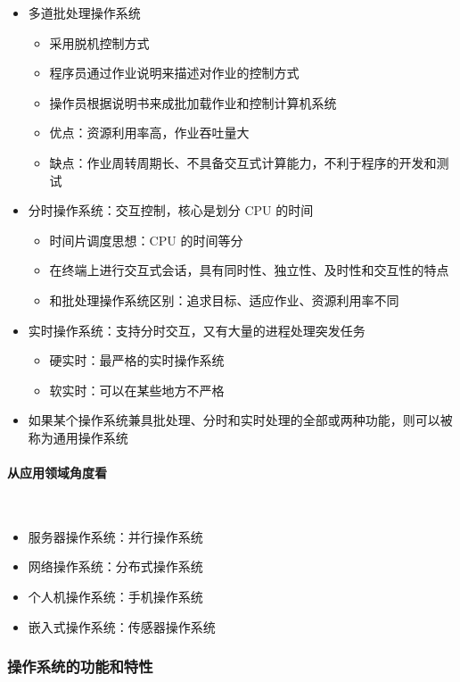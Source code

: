 \documentclass[cs4size,a4paper,10pt]{ctexart}
\begin{document}
		\begin{itemize}
			\item 多道批处理操作系统
			\begin{itemize}
				\item 采用脱机控制方式
				\item 程序员通过作业说明来描述对作业的控制方式
				\item 操作员根据说明书来成批加载作业和控制计算机系统
				\item 优点：资源利用率高，作业吞吐量大
				\item 缺点：作业周转周期长、不具备交互式计算能力，不利于程序的开发和测试
			\end{itemize}
			\item 分时操作系统：交互控制，核心是划分 CPU 的时间
			\begin{itemize}
				\item 时间片调度思想：CPU 的时间等分
				\item 在终端上进行交互式会话，具有同时性、独立性、及时性和交互性的特点
				\item 和批处理操作系统区别：追求目标、适应作业、资源利用率不同
			\end{itemize}
			\item 实时操作系统：支持分时交互，又有大量的进程处理突发任务
			\begin{itemize}
				\item 硬实时：最严格的实时操作系统
				\item 软实时：可以在某些地方不严格
			\end{itemize}
			\item 如果某个操作系统兼具批处理、分时和实时处理的全部或两种功能，则可以被称为通用操作系统
		\end{itemize}


		\paragraph{从应用领域角度看}~{}

		\begin{itemize}
			\item 服务器操作系统：并行操作系统
			\item 网络操作系统：分布式操作系统
			\item 个人机操作系统：手机操作系统
			\item 嵌入式操作系统：传感器操作系统
		\end{itemize}


		\subsubsection{操作系统的功能和特性}
\end{document}
